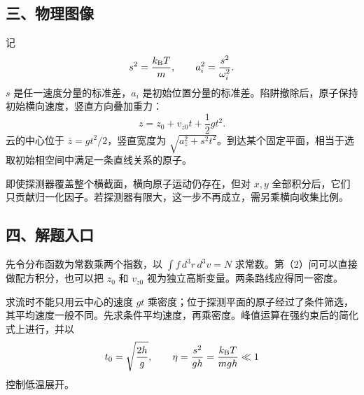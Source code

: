 \documentclass[12pt,a4paper,fontset=fandol]{ctexart}
\begin{document}
\subsection{三、物理图像}\label{ux4e09ux7269ux7406ux56feux50cf}

记 \[
s^2=\frac{k_{\rm B}T}{m},\qquad
a_i^2=\frac{s^2}{\omega_i^2}.
\] \(s\) 是任一速度分量的标准差，\(a_i\)
是初始位置分量的标准差。陷阱撤除后，原子保持初始横向速度，竖直方向叠加重力：
\[
z=z_0+v_{z0}t+\frac12gt^2.
\] 云的中心位于 \(\bar z=gt^2/2\)，竖直宽度为
\(\sqrt{a_z^2+s^2t^2}\)。到达某个固定平面，相当于选取初始相空间中满足一条直线关系的原子。

\begin{center}
\begin{minipage}{\linewidth}
\centering\begingroup
{}
\ifdim\wd\diagrambox>.88\linewidth
\sbox{\diagrambox}{\resizebox{.88\linewidth}{!}{\usebox{\diagrambox}}}
\fi
\ifdim\ht\diagrambox>.40\textheight
\resizebox{!}{.40\textheight}{\usebox{\diagrambox}}
\else\usebox{\diagrambox}\fi
\par{}
\endgroup\end{minipage}
\end{center}

即使探测器覆盖整个横截面，横向原子运动仍存在，但对 \(x,y\)
全部积分后，它们只贡献归一化因子。若探测器有限大，这一步不再成立，需另乘横向收集比例。

\subsection{四、解题入口}\label{ux56dbux89e3ux9898ux5165ux53e3}

先令分布函数为常数乘两个指数，以 \(\int f\,d^3r\,d^3v=N\)
求常数。第（2）问可以直接做配方积分，也可以把 \(z_0\) 和 \(v_{z0}\)
视为独立高斯变量。两条路线应得同一密度。

求流时不能只用云中心的速度 \(gt\)
乘密度；位于探测平面的原子经过了条件筛选，其平均速度一般不同。先求条件平均速度，再乘密度。峰值运算在强约束后的简化式上进行，并以
\[
t_0=\sqrt{\frac{2h}{g}},\qquad
\eta=\frac{s^2}{gh}=\frac{k_{\rm B}T}{mgh}\ll1
\] 控制低温展开。
\end{document}
